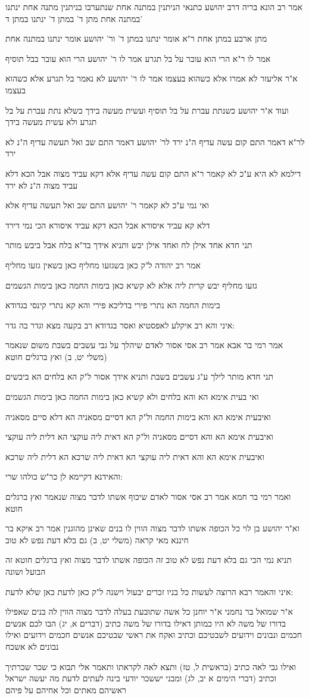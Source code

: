 \documentclass[12pt, openany]{book}
\newcommand{\sethebfont}{
\fontsize{10.5pt}{21.0pt} \selectfont
}
\newcommand{\textblock}[1]{
{\sethebfont #1\\}	
}
\begin{document}
\textblock{אמר רב הונא בריה דרב יהושע כתנאי הניתנין במתנה אחת שנתערבו בניתנין מתנה אחת ינתנו במתנה אחת מתן ד' במתן ד' ינתנו במתן ד'}
\textblock{מתן ארבע במתן אחת ר"א אומר ינתנו במתן ד' ור' יהושע אומר ינתנו במתנה אחת}
\textblock{אמר לו ר"א הרי הוא עובר על בל תגרע אמר לו ר' יהושע הרי הוא עובר בבל תוסיף}
\textblock{א"ר אליעזר לא אמרו אלא כשהוא בעצמו אמר לו ר' יהושע לא נאמר בל תגרע אלא כשהוא בעצמו}
\textblock{ועוד א"ר יהושע כשנתת עברת על בל תוסיף ועשית מעשה בידך כשלא נתת עברת על בל תגרע ולא עשית מעשה בידך}
\textblock{לר"א דאמר התם קום עשה עדיף ה"נ ירד לר' יהושע דאמר התם שב ואל תעשה עדיף ה"נ לא ירד}
\textblock{דילמא לא היא ע"כ לא קאמר ר"א התם קום עשה עדיף אלא דקא עביד מצוה אבל הכא דלא עביד מצוה ה"נ לא ירד}
\textblock{ואי נמי ע"כ לא קאמר ר' יהושע התם שב ואל תעשה עדיף אלא}
\textblock{דלא קא עביד איסורא אבל הכא דקא עביד איסורא הכי נמי דירד}
\textblock{תני חדא אחד אילן לח ואחד אילן יבש ותניא אידך בד"א בלח אבל ביבש מותר}
\textblock{אמר רב יהודה ל"ק כאן בשגזעו מחליף כאן בשאין גזעו מחליף}
\textblock{גזעו מחליף יבש קרית ליה אלא לא קשיא כאן בימות החמה כאן בימות הגשמים}
\textblock{בימות החמה הא נתרי פירי בדליכא פירי והא קא נתרי קינסי בגדודא}
\textblock{איני והא רב איקלע לאפסטיא ואסר בגדודא רב בקעה מצא וגדר בה גדר:}
\textblock{אמר רמי בר אבא אמר רב אסי אסור לאדם שיהלך על גבי עשבים בשבת משום שנאמר (משלי יט, ב) ואץ ברגלים חוטא}
\textblock{תני חדא מותר לילך ע"ג עשבים בשבת ותניא אידך אסור ל"ק הא בלחים הא ביבשים}
\textblock{ואי בעית אימא הא והא בלחים ולא קשיא כאן בימות החמה כאן בימות הגשמים}
\textblock{ואיבעית אימא הא והא בימות החמה ול"ק הא דסיים מסאניה הא דלא סיים מסאניה}
\textblock{ואיבעית אימא הא והא דסיים מסאניה ול"ק הא דאית ליה עוקצי הא דלית ליה עוקצי}
\textblock{ואיבעית אימא הא והא דאית ליה עוקצי הא דאית ליה שרכא הא דלית ליה שרכא}
\textblock{והאידנא דקיימא לן כר"ש כולהו שרי:}
\textblock{ואמר רמי בר חמא אמר רב אסי אסור לאדם שיכוף אשתו לדבר מצוה שנאמר ואץ ברגלים חוטא}
\textblock{וא"ר יהושע בן לוי כל הכופה אשתו לדבר מצוה הווין לו בנים שאינן מהוגנין אמר רב איקא בר חיננא מאי קראה (משלי יט, ב) גם בלא דעת נפש לא טוב}
\textblock{תניא נמי הכי גם בלא דעת נפש לא טוב זה הכופה אשתו לדבר מצוה ואץ ברגלים חוטא זה הבועל ושונה}
\textblock{איני והאמר רבא הרוצה לעשות כל בניו זכרים יבעול וישנה ל"ק כאן לדעת כאן שלא לדעת:}
\textblock{א"ר שמואל בר נחמני א"ר יוחנן כל אשה שתובעת בעלה לדבר מצוה הווין לה בנים שאפילו בדורו של משה לא היו כמותן דאילו בדורו של משה כתיב (דברים א, יג) הבו לכם אנשים חכמים ונבונים וידועים לשבטיכם וכתיב ואקח את ראשי שבטיכם אנשים חכמים וידועים ואילו נבונים לא אשכח}
\textblock{ואילו גבי לאה כתיב (בראשית ל, טז) ותצא לאה לקראתו ותאמר אלי תבוא כי שכר שכרתיך וכתיב (דברי הימים א יב, לג) ומבני יששכר יודעי בינה לעתים לדעת מה יעשה ישראל ראשיהם מאתים וכל אחיהם על פיהם}
\end{document}
